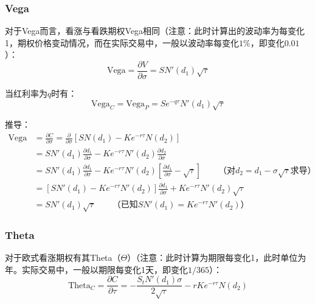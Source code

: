 \documentclass[11pt]{article}
\begin{document}
\subsubsection{Vega}

对于Vega而言，看涨与看跌期权Vega相同（注意：此时计算出的波动率为每变化1，期权价格变动情况，而在实际交易中，一般以波动率每变化$1\%$，即变化$0.01$）：
\begin{equation*}
    \text{Vega} = \frac{\partial V}{\partial \sigma}  = SN'(d_1)\sqrt{\tau}
\end{equation*}

当红利率为$q$时有：
\begin{equation*}
    \text{Vega}_C = \text{Vega}_P = S e^{-q\tau}N'(d_1)\sqrt{\tau}
\end{equation*}

推导：
\begin{align*}
    \text{Vega} &= \frac{\partial C}{\partial \sigma} = \frac{\partial}{\partial \sigma} \left[S N(d_1) - K e^{-r\tau}N(d_2)\right] \\
    &= S N'(d_1) \frac{\partial d_1}{\partial \sigma} - Ke^{-r\tau}N'(d_2) \frac{\partial d_2}{\partial \sigma} \\
    &= S N'(d_1) \frac{\partial d_1}{\partial \sigma} - Ke^{-r\tau}N'(d_2) \left[ \frac{\partial d_1}{\partial \sigma} -\sqrt{\tau} \right] \qquad \text{（对$d_2 = d_1 - \sigma\sqrt{\tau}$求导）} \\
    &= \left[ S N'(d_1) - Ke^{-r\tau}N'(d_2) \right] \frac{\partial d_1}{\partial \sigma} + Ke^{-r\tau}N'(d_2) \sqrt{\tau} \\
    &= S N'(d_1)\sqrt{\tau} \qquad \text{（已知$S N'(d_1) = Ke^{-r\tau}N'(d_2)$）}
\end{align*}

\subsubsection{Theta}

对于欧式看涨期权有其Theta（$\Theta$）（注意：此时计算为期限每变化1，此时单位为年。实际交易中，一般以期限每变化1天，即变化$1/365$）：
\begin{equation*}
    \text{Theta}_C = \frac{\partial C}{\partial \tau} = -\frac{S_t N'(d_1)\sigma}{2\sqrt{\tau}} - r K e^{-r\tau}N(d_2)
\end{equation*}
\end{document}
